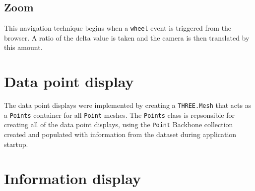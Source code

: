 {{		
	
	}

	\subsection{Zoom} {
	\label{sec:zoom}

		This navigation technique begins when a \texttt{wheel} event is triggered from the browser. A ratio of the delta value is taken and the camera is then translated by this amount.
	
	}

}

\section{Data point display} {
\label{sec:data_point_display}

	The data point displays were implemented by creating a \texttt{THREE.Mesh} that acts as a \texttt{Points} container for all \texttt{Point} meshes. The \texttt{Points} class is repsonsible for creating all of the data point displays, using the \texttt{Point} Backbone collection created and populated with information from the dataset during application startup.



	


}

\section{Information display} {
\label{sec:information_display}



	

}

